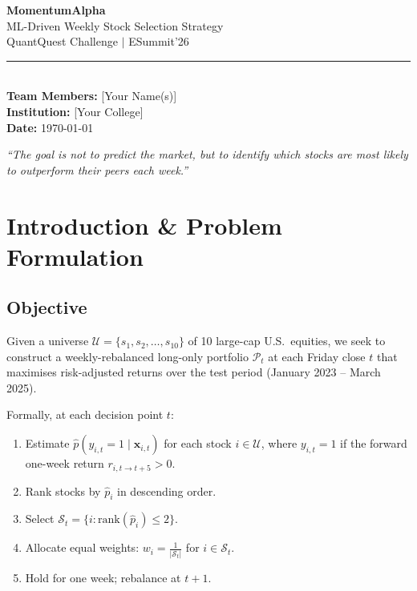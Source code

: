 \documentclass[12pt,a4paper]{article}
\begin{document}
\begin{titlepage}
\centering
\vspace*{2cm}

{\Huge\bfseries\color{accentblue} MomentumAlpha}\\[0.5cm]
{\LARGE ML-Driven Weekly Stock Selection Strategy}\\[2cm]

{\Large QuantQuest Challenge $|$ ESummit'26}\\[1cm]

\rule{\linewidth}{1pt}\\[1cm]

{\large
\textbf{Team Members:} [Your Name(s)]\\[0.3cm]
\textbf{Institution:} [Your College]\\[0.3cm]
\textbf{Date:} \today
}

\vfill

\textit{``The goal is not to predict the market, but to identify which stocks are most likely to outperform their peers each week.''}

\vspace{1cm}
\end{titlepage}

\tableofcontents
\newpage

\section{Introduction \& Problem Formulation}

\subsection{Objective}
Given a universe $\mathcal{U} = \{s_1, s_2, \ldots, s_{10}\}$ of 10 large-cap U.S.\ equities, we seek to construct a weekly-rebalanced long-only portfolio $\mathcal{P}_t$ at each Friday close $t$ that maximises risk-adjusted returns over the test period (January 2023 -- March 2025).

Formally, at each decision point $t$:
\begin{enumerate}[label=(\roman*)]
    \item Estimate $\hat{p}(y_{i,t}=1 \mid \mathbf{x}_{i,t})$ for each stock $i \in \mathcal{U}$, where $y_{i,t}=1$ if the forward one-week return $r_{i,t \to t+5} > 0$.
    \item Rank stocks by $\hat{p}_i$ in descending order.
    \item Select $\mathcal{S}_t = \{i : \text{rank}(\hat{p}_i) \leq 2\}$.
    \item Allocate equal weights: $w_i = \frac{1}{|\mathcal{S}_t|}$ for $i \in \mathcal{S}_t$.
    \item Hold for one week; rebalance at $t+1$.
\end{enumerate}
\end{document}
